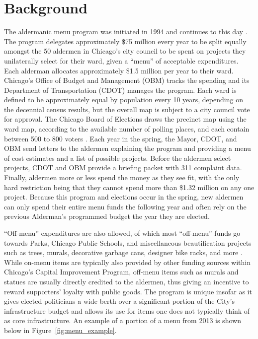 \section{Background}\label{sec:background}

The aldermanic menu program was initiated in 1994 and continues to this day \citep{OIGaudit}. 
The program delegates approximately \$75 million every year to be split equally amongst the 50 aldermen in Chicago's city council to be spent on projects they unilaterally select for their ward, given a ``menu'' of acceptable expenditures. 
Each alderman allocates approximately \$1.5 million per year to their ward.
Chicago's Office of Budget and Management (OBM) tracks the spending and its Department of Transportation (CDOT) manages the program.
Each ward is defined to be approximately equal by population every 10 years, depending on the decennial census results, but the overall map is subject to a city council vote for approval.
The Chicago Board of Elections draws the precinct map using the ward map, according to the available number of polling places, and each contain between 500 to 800 voters \citep{Crowley_2022}.
Each year in the spring, the Mayor, CDOT, and OBM send letters to the aldermen explaining the program and providing a menu of cost estimates and a list of possible projects.
Before the aldermen select projects, CDOT and OBM provide a briefing packet with 311 complaint data.
Finally, aldermen more or less spend the money as they see fit, with the only hard restriction being that they cannot spend more than \$1.32 million on any one project.
Because this program and elections occur in the spring, new aldermen can only spend their entire menu funds the following year and often rely on the previous Alderman's programmed budget the year they are elected.

``Off-menu'' expenditures are also allowed, of which most ``off-menu'' funds go towards Parks, Chicago Public Schools, and miscellaneous beautification projects such as trees, murals, decorative garbage cans, designer bike racks, and more \citep{OIGaudit}. 
While on-menu items are typically also provided by other funding sources within Chicago's Capital Improvement Program, off-menu items such as murals and statues are usually directly credited to the aldermen, thus giving an incentive to reward supporters' loyalty with public goods.
The program is unique insofar as it gives elected politicians a wide berth over a significant portion of the City's infrastructure budget and allows its use for items one does not typically think of as core infrastructure. 
An example of a portion of a menu from 2013 is shown below in Figure~\ref{fig:menu_example}.


